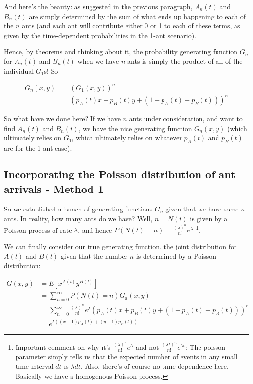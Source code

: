 \documentclass{article}
\begin{document}
And here's the beauty: as suggested in the previous paragraph, $A_n(t)$ and $B_n(t)$ are simply determined by the sum of what ends up happening to each of the $n$ ants (and each ant will contribute either 0 or 1 to each of these terms, as given by the time-dependent probabilities in the 1-ant scenario). 

Hence, by theorems and thinking about it, the probability generating function $G_n$ for $A_n(t)$ and $B_n(t)$ when we have $n$ ants is simply the product of all of the individual $G_1$s! So

\begin{align*}
G_n(x,y) &= (G_1(x,y))^n \\
&= (p_A(t) x + p_B(t) y + (1 - p_A(t) - p_B(t)))^n
\end{align*}

So what have we done here? If we have $n$ ants under consideration, and want to find $A_n(t)$ and $B_n(t)$, we have the nice generating function $G_n(x,y)$ (which ultimately relies on $G_1$, which ultimately relies on whatever $p_A(t)$ and $p_B(t)$ are for the 1-ant case). 


\subsection{Incorporating the Poisson distribution of ant arrivals - Method 1}

So we established a bunch of generating functions $G_n$ given that we have some $n$ ants. In reality, how many ants do we have? Well, $n = N(t)$ is given by a Poisson process of rate $\lambda$, and hence $P(N(t) = n) = \frac{(\lambda)^n}{n!} e^{\lambda}$ \footnote{Important comment on why it's $\frac{(\lambda)^n}{n!} e^{\lambda}$ and not $\frac{(\lambda t)^n}{n!} e^{\lambda t}$: The poisson parameter simply tells us that the expected number of events in any small time interval $dt$ is $\lambda dt$. Also, there's of course no time-dependence here. Basically we have a homogenous Poisson process.}. 

We can finally consider our true generating function, the joint distribution for $A(t)$ and $B(t)$ given that the number $n$ is determined by a Poisson distribution:

\begin{align*}
G(x,y) &= E[x^{A(t)} y^{B(t)}] \\
&= \sum_{n=0}^\infty P(N(t) = n) G_n(x, y) \\
&= \sum_{n=0}^\infty \frac{(\lambda)^n}{n!} e^{\lambda} (p_A(t) x + p_B(t) y + (1 - p_A(t) - p_B(t)))^n \\
&= e^{\lambda ( (x-1)p_A(t) + (y-1)p_B(t) )}
\end{align*}
\end{document}
